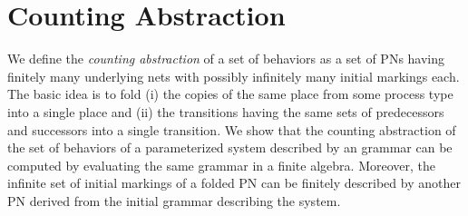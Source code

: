 \section{Counting Abstraction}

We define the \emph{counting abstraction} of a set of behaviors as a
set of PNs having finitely many underlying nets with possibly
infinitely many initial markings each. The basic idea is to fold (i)
the copies of the same place from some process type into a single
place and (ii) the transitions having the same sets of predecessors
and successors into a single transition. We show that the counting
abstraction of the set of behaviors of a parameterized system
described by an \hrtext{} grammar can be computed by evaluating the
same grammar in a finite \hrtext{} algebra. Moreover, the infinite set
of initial markings of a folded PN can be finitely described by
another PN derived from the initial grammar describing the system.

